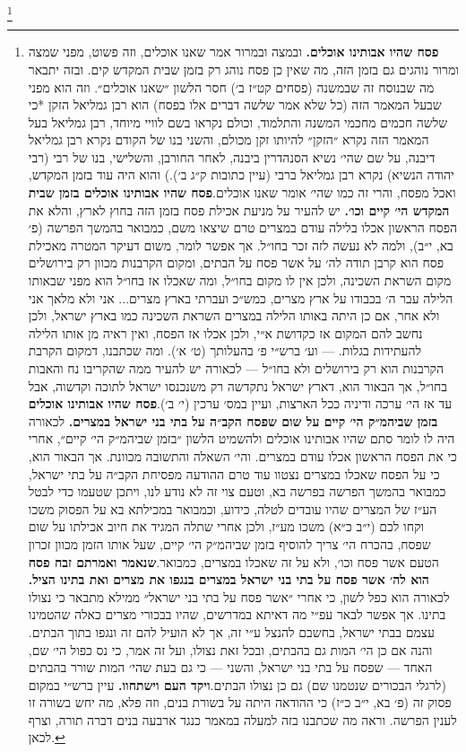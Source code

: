 \documentclass[12pt, openany]{book}
\newcommand{\footnotecomment}[1]{
	\renewcommand\thefootnote{}
	\footnote{\textsf{#1}}}
\newcommand{\commenta}[1]{\footnotecomment{#1}\hspace{0em}}
\begin{document}
\commenta{\textrm{\textbf{פסח שהיו אבותינו אוכלים.}} ובמצה ובמרור אמר שאנו אוכלים, וזה פשוט, מפני שמצה ומרור נוהגים גם בזמן הזה, מה שאין כן פסח נוהג רק בזמן שבית המקדש קים. ובזה יתבאר מה שבנוסח זה שבמשנה (פסחים קט״ז ב׳) חסר הלשון ״שאנו אוכלים״. וזה הוא מפני שבעל המאמר הזה (כל שלא אמר שלשה דברים אלו  בפסח) הוא רבן גמליאל הזקן *כי שלשה חכמים מחכמי המשנה והתלמוד, וכולם נקראו בשם לוויי מיוחד, רבן גמליאל בעל המאמר הזה נקרא ״הזקן״ להיותו זקן מכולם, והשני בנו של הקודם נקרא רבן גמליאל דיבנה, על שם שהי׳ נשיא הסנהדרין ביבנה, לאחר החורבן, והשלישי, בנו של רבי (רבי יהודה הנשיא) נקרא רבן גמליאל ברבי (עיין כתובות ק״ג ב׳).) והוא היה עוד בזמן המקדש, ואכל מפסח, והרי זה כמו שהי׳ אומר שאנו אוכלים.\textrm{\textbf{פסח שהיו אבותינו אוכלים בזמן שבית המקדש הי׳ קיים וכו׳.}} יש להעיר על מניעת אכילת פסח בזמן הזה בחוץ לארץ, והלא את הפסח הראשון אכלו בלילה עודם במצרים טרם שיצאו משם, כמבואר בהמשך הפרשה (פ׳ בא, י״ב), ולמה לא נעשה לזה זכר בחו״ל. אך אפשר לומר, משום דעיקר המטרה מאכילת פסח הוא קרבן תודה לה׳ על אשר פסח על הבתים, ומקום הקרבנות מכוון רק בירושלים מקום השראת השכינה, ולכן אין לו מקום בחו״ל, ומה שאכלו אז בחו״ל הוא מפני שבאותו הלילה עבר ה׳ בכבודו על ארץ מצרים, כמש״כ ועברתי בארץ מצרים... אני ולא מלאך אני ולא אחר, אם כן היתה באותו הלילה במצרים השראת השכינה כמו בארץ ישראל, ולכן נחשב להם המקום אז כקדושת א״י, ולכן אכלו אז הפסח, ואין ראיה מן אותו הלילה להעתידות בגלות. — וע׳ ברש״י פ׳ בהעלותך (ט׳ א׳). ומה שכתבנו, דמקום הקרבת הקרבנות הוא רק בירושלים ולא בחו״ל — לכאורה יש להעיר ממה שהקריבו נח והאבות בחו״ל, אך הבאור הוא, דארץ ישראל נתקדשה רק משנכנסו ישראל לתוכה וקדשוה, אבל עד אז הי׳ ערכה ודיניה ככל הארצות, ועיין במס׳ ערכין (י׳ ב׳).\textrm{\textbf{פסח שהיו אבותינו אוכלים בזמן שביהמ״ק הי׳ קיים על שום שפסח הקב״ה על בתי בני ישראל במצרים.}} לכאורה היה לו לומר סתם שהיו אבותינו אוכלים ולהשמיט הלשון ״בזמן שביהמ״ק הי׳ קיים״, אחרי כי את הפסח הראשון אכלו עודם במצרים. והי׳ השאלה והתשובה מכוונת. אך הבאור הוא, כי על הפסח שאכלו במצרים נצטוו עוד טרם ההודעה מפסיחת הקב״ה על בתי ישראל, כמבואר בהמשך הפרשה בפרשה בא, וטעם צוי זה לא נודע לנו, ויתכן שטעמו כדי לבטל הע״ז של המצרים שהיו עובדים לטלה, כידוע, וכמבואר במכילתא בא על הפסוק משכו וקחו לכם (י״ב כ״א) משכו מע״ז, ולכן אחרי שתלה המגיד את חיוב אכילתו על שום שפסח, בהכרח הי׳ צריך להוסיף בזמן שביהמ״ק הי׳ קיים, שעל אותו הזמן מכוון זכרון הטעם אשר פסח וכו׳, ולא על זה שאכלו במצרים, כמבואר.\textrm{\textbf{שנאמר ואמרתם זבח פסח הוא לה׳ אשר פסח על בתי בני ישראל במצרים בנגפו את מצרים ואת בתינו הציל.}} לכאורה הוא כפל לשון, כי אחרי ״אשר פסח על בתי בני ישראל״ ממילא מתבאר כי נצולו בתינו. אך אפשר לבאר עפ״י מה דאיתא במדרשים, שהיו בבכורי מצרים כאלה שהטמינו עצמם בבתי ישראל, בחשבם להנצל ע״י זה, אך לא הועיל להם זה ונגפו בתוך הבתים. והנה אם כן הי׳ המות גם בהבתים, ובכל זאת נצולו, ועל זה אמר, כי נס כפול הי׳ שם, האחד — שפסח על בתי בני ישראל, והשני — כי גם בעת שהי׳ המות שורר בהבתים (לרגלי הבכורים שנטמנו שם) גם כן נצולו הבתים.\textrm{\textbf{ויקד העם וישתחוו.}} עיין ברש״י במקום פסוק זה (פ׳ בא, י״ב כ״ז) כי ההודאה היתה על בשורת בנים, וזה פלא, מה יחש בשורה זו לענין הפרשה. וראה מה שכתבנו בזה למעלה במאמר כנגד ארבעה בנים דברה תורה, וצרף לכאן.}%
\end{document}
